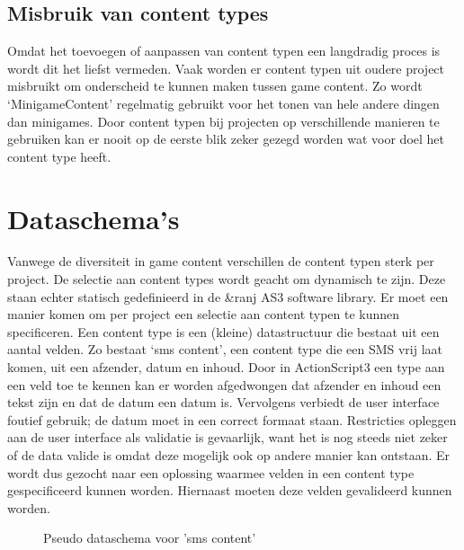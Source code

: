 \subsection{Misbruik van content types}
Omdat het toevoegen of aanpassen van content typen een langdradig proces is wordt dit het liefst vermeden. Vaak worden er content typen uit oudere project misbruikt om onderscheid te kunnen maken tussen game content. Zo wordt ‘MinigameContent’ regelmatig gebruikt voor het tonen van hele andere dingen dan minigames.
Door content typen bij projecten op verschillende manieren te gebruiken kan er nooit op de eerste blik zeker gezegd worden wat voor doel het content type heeft.

\section{Dataschema’s}
Vanwege de diversiteit in game content verschillen de content typen sterk per project. De selectie aan content types wordt geacht om dynamisch te zijn. Deze staan echter statisch gedefinieerd in de \&ranj AS3 software library. Er moet een manier komen om per project een selectie aan content typen te kunnen specificeren.
Een content type is een (kleine) datastructuur die bestaat uit een aantal velden. Zo bestaat ‘sms content’, een content type die een SMS vrij laat komen, uit een afzender, datum en inhoud. Door in ActionScript3 een type aan een veld toe te kennen kan er worden afgedwongen dat afzender en inhoud een tekst zijn en dat de datum een datum is. Vervolgens verbiedt de user interface foutief gebruik; de datum moet in een correct formaat staan. Restricties opleggen aan de user interface als validatie is gevaarlijk, want het is nog steeds niet zeker of de data valide is omdat deze mogelijk ook op andere manier kan ontstaan. Er wordt dus gezocht naar een oplossing waarmee velden in een content type gespecificeerd kunnen worden. Hiernaast moeten deze velden gevalideerd kunnen worden.

\begin{wrapfigure}{r}{0.5\textwidth}
    \caption{Pseudo dataschema voor 'sms content'}
    \label{fig:pseudosmscontent}
\end{wrapfigure}

